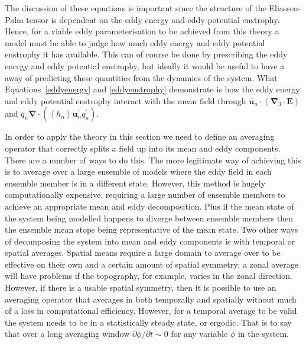 \documentclass[12pt,a4paper]{report}
\newcommand*\mean[1]{\overline{#1}}
\newcommand*\thkmean[1]{\overline{#1}}
\newcommand*\thkres[1]{{#1}^{\prime}}
\newcommand*\nthkmean[1]{\left\langle{#1}\right\rangle}
\begin{document}
              The discussion of these equations is important since
              the structure of the Eliassen-Palm tensor is 
              dependent on the eddy energy and eddy potential enstrophy. 
              Hence, for a viable eddy parameterisation to be achieved
              from this theory a model must be able to 
              judge how much eddy energy and eddy potential enstrophy it has
              available. This can of course be done by prescribing the
               eddy energy and eddy potential enstrophy, but ideally 
               it would be useful to have a away of predicting these
               quantities from the dynamics of the system. What Equations~\eqref{eddyenergy}
               and \eqref{eddyenstrophy} demonstrate is how the eddy energy 
               and eddy potential enstrophy interact with the mean field through
               $\thkmean{\boldsymbol{u}}_{n} \cdot \left(\boldsymbol{\nabla}_{3}\cdot \boldsymbol{E}\right)$ and $\thkmean{q}_{n} \boldsymbol{\nabla}\cdot\left( \nthkmean{h_{n}} \thkmean{\thkres{\boldsymbol{u}}_{n}\thkres{q}_{n}} \right)$.
              
              
              In order to apply the theory in this section we need to define an
              averaging operator that correctly splits a field up into its mean
              and eddy components. There are a number of ways to do this. 
              The more legitimate way of achieving this is
              to average over a large ensemble of models where the eddy field in each
              ensemble member is in a different state. However, this method is 
              hugely computationally expensive, requiring a large number of 
              ensemble members to achieve an appropriate mean and eddy
              decomposition. Plus if the mean state of the system being modelled happens 
              to diverge between ensemble members then the ensemble mean stops being 
              representative of the mean state. Two other ways of decomposing
              the system into mean and eddy components is with temporal or spatial
              averages. Spatial means require a large domain to average over to be effective
              on their own and a certain amount of spatial symmetry; a 
              zonal average will have problems if the topography, for example,
              varies in the zonal direction. However, if there is
              a usable spatial symmetry, then it is possible to use
              an averaging operator that averages in both temporally and spatially
              without much of a loss in computational efficiency. However,
              for a temporal average to be valid the system needs to be in
              a statistically steady state, or  ergodic. That is to say that over a long
              averaging window $\partial \mean{\phi} /\partial t \sim 0$ for any variable $\phi$
            in the system.
            
\end{document}
